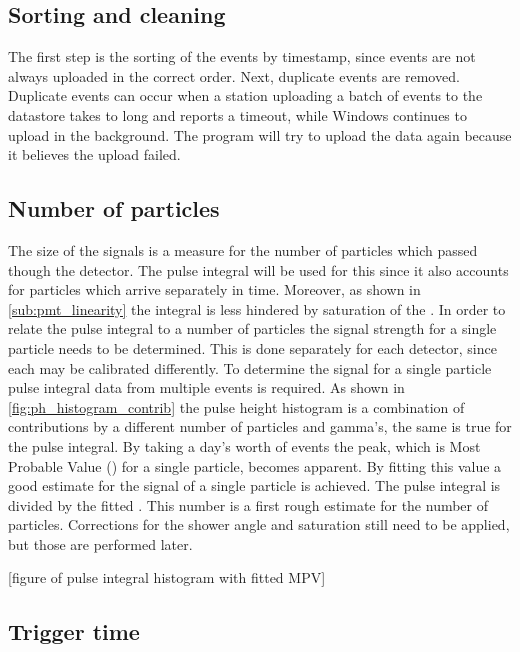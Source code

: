 \subsection{Sorting and cleaning}

The first step is the sorting of the events by timestamp, since events are not always uploaded in the correct order. Next, duplicate events are removed. Duplicate events can occur when a station uploading a batch of events to the datastore takes to long and \python reports a timeout, while Windows continues to upload in the background. The \python program will try to upload the data again because it believes the upload failed.


\subsection{Number of particles}

The size of the signals is a measure for the number of particles which passed though the detector. The pulse integral will be used for this since it also accounts for particles which arrive separately in time. Moreover, as shown in \cref{sub:pmt_linearity} the integral is less hindered by saturation of the \adcs. In order to relate the pulse integral to a number of particles the signal strength for a single particle needs to be determined. This is done separately for each detector, since each may be calibrated differently. To determine the signal for a single particle pulse integral data from multiple events is required. As shown in \cref{fig:ph_histogram_contrib} the pulse height histogram is a combination of contributions by a different number of particles and gamma's, the same is true for the pulse integral. By taking a day's worth of events the peak, which is Most Probable Value (\mpv) for a single particle, becomes apparent. By fitting this value a good estimate for the signal of a single particle is achieved. The pulse integral is divided by the fitted \mpv. This number is a first rough estimate for the number of particles. Corrections for the shower angle and \pmt saturation still need to be applied, but those are performed later.

[figure of pulse integral histogram with fitted MPV]


\subsection{Trigger time}
\label{ssec:trigger_time}

